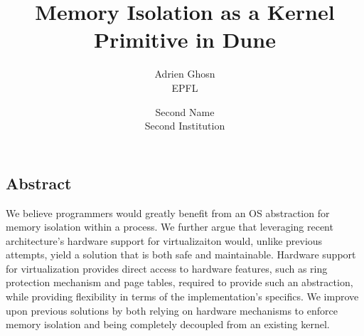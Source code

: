 \documentclass[letterpaper,twocolumn,10pt]{article}
\begin{document}
\date{}

\title{\Large \bf Memory Isolation as a Kernel Primitive in Dune}

\author{
{\rm Adrien Ghosn}\\
EPFL
\and
{\rm Second Name}\\
Second Institution
} %

\maketitle

\thispagestyle{empty}


\subsection*{Abstract}

We believe programmers would greatly benefit from an OS abstraction for memory isolation within a process.
We further argue that leveraging recent architecture's hardware support for virtualizaiton would, unlike previous attempts, yield a solution that is both safe and maintainable.
Hardware support for virtualization provides direct access to hardware features, such as ring protection mechanism and page tables, required to provide such an abstraction, while providing flexibility in terms of the implementation's specifics.
We improve upon previous solutions by both relying on hardware mechanisms to enforce memory isolation and being completely decoupled from an existing kernel.
\end{document}
